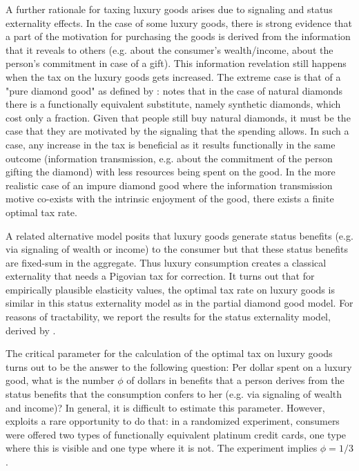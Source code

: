 \documentclass{article}
\begin{document}
A further rationale for taxing luxury goods arises due to signaling and status externality effects. In the case of some luxury goods, there is strong evidence that a part of the motivation for purchasing the goods is derived from the information that it reveals to others (e.g. about the consumer's wealth/income, about the person's commitment in case of a gift). This information revelation still happens when the tax on the luxury goods gets increased. The extreme case is that of a "pure diamond good" as defined by  \citet{ng1987diamonds}:  \citet{ng1987diamonds} notes that in the case of natural diamonds there is a functionally equivalent substitute, namely synthetic diamonds, which cost only a fraction. Given that people still buy natural diamonds, it must be the case that they are motivated by the signaling that the spending allows. In such a case, any increase in the tax is beneficial as it results functionally in the same outcome (information transmission, e.g. about the commitment of the person gifting the diamond) with less resources being spent on the good. In the more realistic case of an impure diamond good where the information transmission motive co-exists with the intrinsic enjoyment of the good, there exists a finite optimal tax rate.

A related alternative model posits that luxury goods generate status benefits (e.g. via signaling of wealth or income) to the consumer but that these status benefits are fixed-sum in the aggregate. Thus luxury consumption creates a classical externality that needs a Pigovian tax for correction. It turns out that for empirically plausible elasticity values, the optimal tax rate on luxury goods is similar in this status externality model as in the partial diamond good model. For reasons of tractability, we report the results for the status externality model, derived by \citet{Xie2026}. 

The critical parameter for the calculation of the optimal tax on luxury goods turns out to be the answer to the following question: Per dollar spent on a luxury good, what is the number $\phi$ of dollars in benefits that a person derives from the status benefits that the consumption confers to her (e.g. via signaling of wealth and income)? In general, it is difficult to estimate this parameter. However, \cite{bursztyn2018status} exploits a rare opportunity to do that: in a randomized experiment, consumers were offered two types of functionally equivalent platinum credit cards, one type where this is visible and one type where it is not.  The experiment implies $\phi=1/3$.
\end{document}
